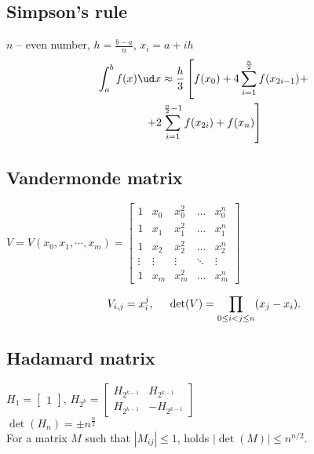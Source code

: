 \subsection*{Simpson's rule}
$n$ -- even number, $h = \frac{b - a}{n}$, $x_i = a + i h$
\begin{multline*}
\int_a^b f(x) \ud x \approx \frac{h}{3} \left[f(x_0) + 4 \sum_{i = 1}^{\frac{n}{2}} f(x_{2 i - 1}) + \right. \\
\left. + 2 \sum_{i = 1}^{\frac{n}{2} - 1} f(x_{2 i}) + f(x_n) \right]
\end{multline*}

\subsection*{Vandermonde matrix}
$V = V(x_0, x_1, \cdots, x_m) =
\begin{bmatrix}
1 & x_0 & x_0^2 & \dots & x_0^n\\
1 & x_1 & x_1^2 & \dots & x_1^n\\
1 & x_2 & x_2^2 & \dots & x_2^n\\
\vdots & \vdots & \vdots & \ddots &\vdots \\
1 & x_m & x_m^2 & \dots & x_m^n
\end{bmatrix}$

$$V_{i,j} = x_i^j, \hspace{5mm} \det(V)=\prod_{0\le i<j\le n} (x_j-x_i).$$ 

\subsection*{Hadamard matrix}
$H_{1} = \begin{bmatrix}
     1
 \end{bmatrix}$, \hspace{10mm}
$H_{2^k} = \begin{bmatrix}
     H_{2^{k-1}} &  H_{2^{k-1}}\\
     H_{2^{k-1}} & -H_{2^{k-1}}
  \end{bmatrix}$\\
  
$\det(H_n) = \pm n^{\frac{n}{2}}$\\

For a matrix $M$ such that $|M_{ij}| \le 1$, holds $|\operatorname{det}(M)| \leq n^{n/2}$.
